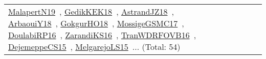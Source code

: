 {\begin{longtable}{lp{3cm}>{\raggedright\arraybackslash}p{6cm}>{\raggedright\arraybackslash}p{6cm}>{\raggedright\arraybackslash}p{8cm}}
\href{works/MalapertN19.pdf}{MalapertN19}~\cite{MalapertN19}, \href{works/GedikKEK18.pdf}{GedikKEK18}~\cite{GedikKEK18}, \href{works/AstrandJZ18.pdf}{AstrandJZ18}~\cite{AstrandJZ18}, \href{works/ArbaouiY18.pdf}{ArbaouiY18}~\cite{ArbaouiY18}, \href{works/GokgurHO18.pdf}{GokgurHO18}~\cite{GokgurHO18}, \href{works/MossigeGSMC17.pdf}{MossigeGSMC17}~\cite{MossigeGSMC17}, \href{works/DoulabiRP16.pdf}{DoulabiRP16}~\cite{DoulabiRP16}, \href{works/ZarandiKS16.pdf}{ZarandiKS16}~\cite{ZarandiKS16}, \href{works/TranWDRFOVB16.pdf}{TranWDRFOVB16}~\cite{TranWDRFOVB16}, \href{works/DejemeppeCS15.pdf}{DejemeppeCS15}~\cite{DejemeppeCS15}, \href{works/MelgarejoLS15.pdf}{MelgarejoLS15}~\cite{MelgarejoLS15}... (Total: 54)\\
\end{longtable}
}

